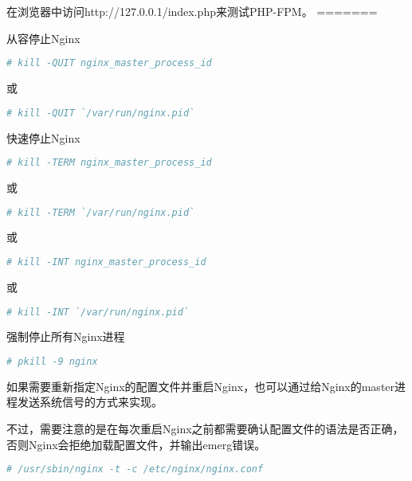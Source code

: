 在浏览器中访问http://127.0.0.1/index.php来测试PHP-FPM。
=======

\begin{compactitem}
\item 从容停止Nginx

\begin{lstlisting}[language=bash]
# kill -QUIT nginx_master_process_id
\end{lstlisting}

或

\begin{lstlisting}[language=bash]
# kill -QUIT `/var/run/nginx.pid`
\end{lstlisting}

\item 快速停止Nginx

\begin{lstlisting}[language=bash]
# kill -TERM nginx_master_process_id
\end{lstlisting}

或

\begin{lstlisting}[language=bash]
# kill -TERM `/var/run/nginx.pid`
\end{lstlisting}

或

\begin{lstlisting}[language=bash]
# kill -INT nginx_master_process_id
\end{lstlisting}

或

\begin{lstlisting}[language=bash]
# kill -INT `/var/run/nginx.pid`
\end{lstlisting}

\item 强制停止所有Nginx进程

\begin{lstlisting}[language=bash]
# pkill -9 nginx
\end{lstlisting}
\end{compactitem}


如果需要重新指定Nginx的配置文件并重启Nginx，也可以通过给Nginx的master进程发送系统信号的方式来实现。

不过，需要注意的是在每次重启Nginx之前都需要确认配置文件的语法是否正确，否则Nginx会拒绝加载配置文件，并输出emerg错误。



\begin{lstlisting}[language=bash]
# /usr/sbin/nginx -t -c /etc/nginx/nginx.conf
\end{lstlisting}

